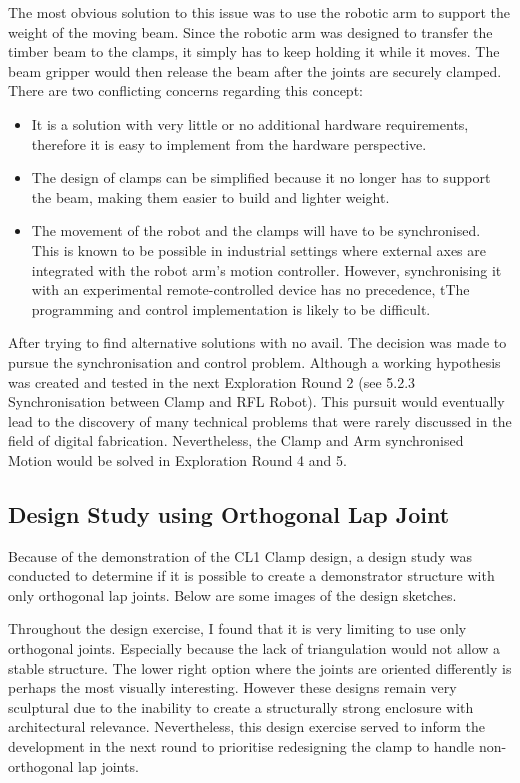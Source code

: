 The most obvious solution to this issue was to use the robotic arm to support the weight of the moving beam. Since the robotic arm was designed to transfer the timber beam to the clamps, it simply has to keep holding it while it moves. The beam gripper would then release the beam after the joints are securely clamped. There are two conflicting concerns regarding this concept:
\begin{itemize}
    \item It is a solution with very little or no additional hardware requirements, therefore it is easy to implement from the hardware perspective.
    \item The design of clamps can be simplified because it no longer has to support the beam, making them easier to build and lighter weight.
    \item The movement of the robot and the clamps will have to be synchronised. This is known to be possible in industrial settings where external axes are integrated with the robot arm’s motion controller. However, synchronising it with an experimental remote-controlled device has no precedence, tThe programming and control implementation is likely to be difficult.
\end{itemize}
After trying to find alternative solutions with no avail. The decision was made to pursue the synchronisation and control problem. Although a working hypothesis was created and tested in the next Exploration Round 2 (see 5.2.3 Synchronisation between Clamp and RFL Robot). This pursuit would eventually lead to the discovery of many technical problems that were rarely discussed in the field of digital fabrication. Nevertheless, the Clamp and Arm synchronised Motion would be solved in Exploration Round 4 and 5.

\subsection{Design Study using Orthogonal Lap Joint}
\label{subsection:exploration_1_design_study_using_orthogonal_lap_joint}

Because of the demonstration of the CL1 Clamp design, a design study was conducted to determine if it is possible to create a demonstrator structure with only orthogonal lap joints. Below are some images of the design sketches.  


Throughout the design exercise, I found that it is very limiting to use only orthogonal joints. Especially because the lack of triangulation would not allow a stable structure. The lower right option where the joints are oriented differently is perhaps the most visually interesting. However these designs remain very sculptural due to the inability to create a structurally strong enclosure with architectural relevance. 
Nevertheless, this design exercise served to inform the development in the next round to prioritise redesigning the clamp to handle non-orthogonal lap joints.
